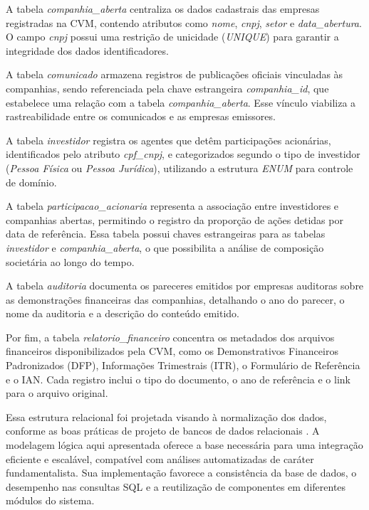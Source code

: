 A tabela \textit{companhia\_aberta} centraliza os dados cadastrais das empresas registradas na CVM, contendo atributos como \textit{nome}, \textit{cnpj}, \textit{setor} e \textit{data\_abertura}. O campo \textit{cnpj} possui uma restrição de unicidade (\textit{UNIQUE}) para garantir a integridade dos dados identificadores.

A tabela \textit{comunicado} armazena registros de publicações oficiais vinculadas às companhias, sendo referenciada pela chave estrangeira \textit{companhia\_id}, que estabelece uma relação com a tabela \textit{companhia\_aberta}. Esse vínculo viabiliza a rastreabilidade entre os comunicados e as empresas emissores.

A tabela \textit{investidor} registra os agentes que detêm participações acionárias, identificados pelo atributo \textit{cpf\_cnpj}, e categorizados segundo o tipo de investidor (\textit{Pessoa Física} ou \textit{Pessoa Jurídica}), utilizando a estrutura \textit{ENUM} para controle de domínio.

A tabela \textit{participacao\_acionaria} representa a associação entre investidores e companhias abertas, permitindo o registro da proporção de ações detidas por data de referência. Essa tabela possui chaves estrangeiras para as tabelas \textit{investidor} e \textit{companhia\_aberta}, o que possibilita a análise de composição societária ao longo do tempo.

A tabela \textit{auditoria} documenta os pareceres emitidos por empresas auditoras sobre as demonstrações financeiras das companhias, detalhando o ano do parecer, o nome da auditoria e a descrição do conteúdo emitido.

Por fim, a tabela \textit{relatorio\_financeiro} concentra os metadados dos arquivos financeiros disponibilizados pela CVM, como os Demonstrativos Financeiros Padronizados (DFP), Informações Trimestrais (ITR), o Formulário de Referência e o IAN. Cada registro inclui o tipo do documento, o ano de referência e o link para o arquivo original.

Essa estrutura relacional foi projetada visando à normalização dos dados, conforme as boas práticas de projeto de bancos de dados relacionais \cite{elmasri:2016:fundamentals}. A modelagem lógica aqui apresentada oferece a base necessária para uma integração eficiente e escalável, compatível com análises automatizadas de caráter fundamentalista. Sua implementação favorece a consistência da base de dados, o desempenho nas consultas SQL e a reutilização de componentes em diferentes módulos do sistema.



